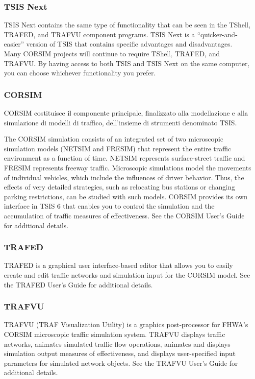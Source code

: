 \subsubsection{TSIS Next}

TSIS Next contains the same type of functionality that can be seen in the TShell, TRAFED, and TRAFVU
component programs. TSIS Next is a “quicker-and-easier” version of TSIS that contains specific advantages and
disadvantages. Many CORSIM projects will continue to require TShell, TRAFED, and TRAFVU. By having
access to both TSIS and TSIS Next on the same computer, you can choose whichever functionality you prefer.

\subsubsection{CORSIM}

\acf{CORSIM} costituisce il componente principale, finalizzato alla modellazione e alla simulazione di modelli di traffico, dell'insieme di strumenti denominato \acs{TSIS}.

The CORSIM simulation consists of an integrated set of two microscopic simulation models (NETSIM and
FRESIM) that represent the entire traffic environment as a function of time. NETSIM represents surface-street
traffic and FRESIM represents freeway traffic. Microscopic simulations model the movements of individual
vehicles, which include the influences of driver behavior. Thus, the effects of very detailed strategies, such as
relocating bus stations or changing parking restrictions, can be studied with such models. CORSIM provides its
own interface in TSIS 6 that enables you to control the simulation and the accumulation of traffic measures of
effectiveness. See the CORSIM User's Guide for additional details.

\subsubsection{TRAFED}

TRAFED is a graphical user interface-based editor that allows you to easily create and edit traffic networks and
simulation input for the CORSIM model. See the TRAFED User's Guide for additional details.

\subsubsection{TRAFVU}

TRAFVU (TRAF Visualization Utility) is a graphics post-processor for FHWA’s CORSIM microscopic traffic
simulation system. TRAFVU displays traffic networks, animates simulated traffic flow operations, animates and displays simulation output measures of effectiveness, and displays user-specified input parameters for simulated
network objects. See the TRAFVU User's Guide for additional details.

